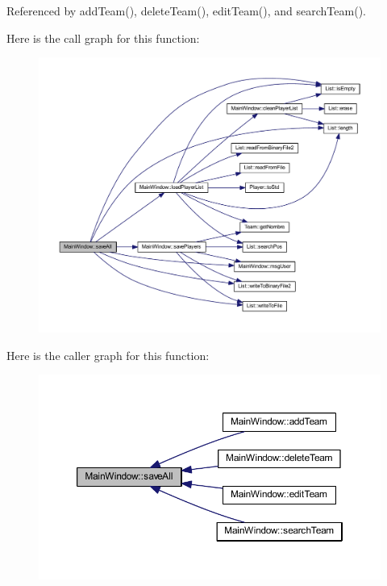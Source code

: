 Referenced by add\+Team(), delete\+Team(), edit\+Team(), and search\+Team().



Here is the call graph for this function\+:
\nopagebreak
\begin{figure}[H]
\begin{center}
\leavevmode
\includegraphics[width=350pt]{d9/dc6/class_main_window_a149085ca2d6cce59ecb59dcbf0892c07_cgraph}
\end{center}
\end{figure}




Here is the caller graph for this function\+:
\nopagebreak
\begin{figure}[H]
\begin{center}
\leavevmode
\includegraphics[width=350pt]{d9/dc6/class_main_window_a149085ca2d6cce59ecb59dcbf0892c07_icgraph}
\end{center}
\end{figure}


